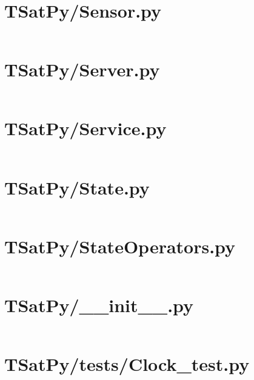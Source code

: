 \pagebreak
\section*{TSatPy/Sensor.py}\label{code:TSatPy/Sensor.py}\inputminted[linenos,fontsize=\scriptsize]{python}{/home/dcouture/git/mathyourlife/TSatPy/TSatPy/Sensor.py}

\pagebreak
\section*{TSatPy/Server.py}\label{code:TSatPy/Server.py}\inputminted[linenos,fontsize=\scriptsize]{python}{/home/dcouture/git/mathyourlife/TSatPy/TSatPy/Server.py}

\pagebreak
\section*{TSatPy/Service.py}\label{code:TSatPy/Service.py}\inputminted[linenos,fontsize=\scriptsize]{python}{/home/dcouture/git/mathyourlife/TSatPy/TSatPy/Service.py}

\pagebreak
\section*{TSatPy/State.py}\label{code:TSatPy/State.py}\inputminted[linenos,fontsize=\scriptsize]{python}{/home/dcouture/git/mathyourlife/TSatPy/TSatPy/State.py}

\pagebreak
\section*{TSatPy/StateOperators.py}\label{code:TSatPy/StateOperators.py}\inputminted[linenos,fontsize=\scriptsize]{python}{/home/dcouture/git/mathyourlife/TSatPy/TSatPy/StateOperators.py}

\pagebreak
\section*{TSatPy/\_\_init\_\_.py}\label{code:TSatPy/__init__.py}\inputminted[linenos,fontsize=\scriptsize]{python}{/home/dcouture/git/mathyourlife/TSatPy/TSatPy/__init__.py}

\pagebreak
\section*{TSatPy/tests/Clock\_test.py}\label{code:TSatPy/tests/Clock_test.py}
\inputminted[linenos,fontsize=\scriptsize]{python}{/home/dcouture/git/mathyourlife/TSatPy/TSatPy/tests/Clock_test.py}

